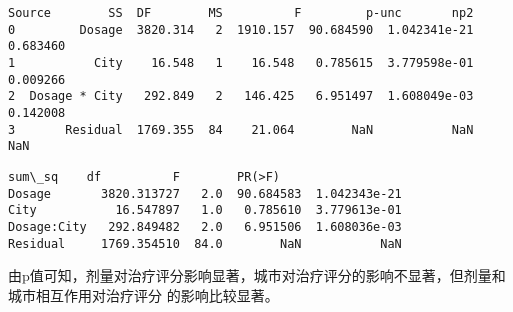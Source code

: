 \documentclass[11pt]{article}
\makeatletter
\newcommand{\boxspacing}{\kern\kvtcb@left@rule\kern\kvtcb@boxsep}
\newcommand{\prompt}[4]{
        \ttfamily\llap{{\color{#2}[#3]:\hspace{3pt}#4}}\vspace{-\baselineskip}
    }
\makeatother
\begin{document}
            \begin{tcolorbox}[breakable, size=fbox, boxrule=.5pt, pad at break*=1mm, opacityfill=0]
\prompt{Out}{outcolor}{13}{\boxspacing}
\begin{Verbatim}[commandchars=\\\{\}]
          Source        SS  DF        MS          F         p-unc       np2
0         Dosage  3820.314   2  1910.157  90.684590  1.042341e-21  0.683460
1           City    16.548   1    16.548   0.785615  3.779598e-01  0.009266
2  Dosage * City   292.849   2   146.425   6.951497  1.608049e-03  0.142008
3       Residual  1769.355  84    21.064        NaN           NaN       NaN
\end{Verbatim}
\end{tcolorbox}
        
    \begin{Verbatim}[commandchars=\\\{\}]
                  sum\_sq    df          F        PR(>F)
Dosage       3820.313727   2.0  90.684583  1.042343e-21
City           16.547897   1.0   0.785610  3.779613e-01
Dosage:City   292.849482   2.0   6.951506  1.608036e-03
Residual     1769.354510  84.0        NaN           NaN
    \end{Verbatim}

    由p值可知，剂量对治疗评分影响显著，城市对治疗评分的影响不显著，但剂量和城市相互作用对治疗评分
    的影响比较显著。


    
    
    
\end{document}
